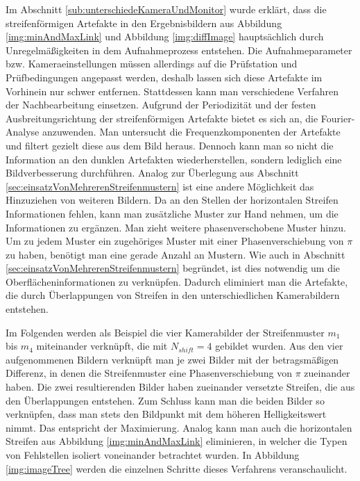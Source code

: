 Im Abschnitt \ref{sub:unterschiedeKameraUndMonitor} wurde erklärt, dass die streifenförmigen Artefakte in den Ergebnisbildern aus Abbildung \ref{img:minAndMaxLink} und Abbildung \ref{img:diffImage} hauptsächlich durch Unregelmäßigkeiten in dem Aufnahmeprozess entstehen.
Die Aufnahmeparameter bzw. Kameraeinstellungen müssen allerdings auf die Prüfstation und Prüfbedingungen angepasst werden, deshalb lassen sich diese Artefakte im Vorhinein nur schwer entfernen.
Stattdessen kann man verschiedene Verfahren der Nachbearbeitung einsetzen.
Aufgrund der Periodizität und der festen Ausbreitungsrichtung der streifenförmigen Artefakte bietet es sich an, die Fourier-Analyse anzuwenden.
Man untersucht die Frequenzkomponenten der Artefakte und filtert gezielt diese aus dem Bild heraus.
Dennoch kann man so nicht die Information an den dunklen Artefakten wiederherstellen, sondern lediglich eine Bildverbesserung durchführen.
Analog zur Überlegung aus Abschnitt \ref{sec:einsatzVonMehrerenStreifenmustern} ist eine andere Möglichkeit das Hinzuziehen von weiteren Bildern.
Da an den Stellen der horizontalen Streifen Informationen fehlen, kann man zusätzliche Muster zur Hand nehmen, um die Informationen zu ergänzen.
Man zieht weitere phasenverschobene Muster hinzu.
Um zu jedem Muster ein zugehöriges Muster mit einer Phasenverschiebung von $\pi$ zu haben, benötigt man eine gerade Anzahl an Mustern.
Wie auch in Abschnitt \ref{sec:einsatzVonMehrerenStreifenmustern} begründet, ist dies notwendig um die Oberflächeninformationen zu verknüpfen.
Dadurch eliminiert man die Artefakte, die durch Überlappungen von Streifen in den unterschiedlichen Kamerabildern entstehen.

\p
Im Folgenden werden als Beispiel die vier Kamerabilder der Streifenmuster $m_1$ bis $m_4$ miteinander verknüpft, die mit $N_{shift} = 4$ gebildet wurden.
Aus den vier aufgenommenen Bildern verknüpft man je zwei Bilder mit der betragsmäßigen Differenz, in denen die Streifenmuster eine Phasenverschiebung von $\pi$ zueinander haben.
Die zwei resultierenden Bilder haben zueinander versetzte Streifen, die aus den Überlappungen entstehen.
Zum Schluss kann man die beiden Bilder so verknüpfen, dass man stets den Bildpunkt mit dem höheren Helligkeitswert nimmt.
Das entspricht der Maximierung.
Analog kann man auch die horizontalen Streifen aus Abbildung \ref{img:minAndMaxLink} eliminieren, in welcher die Typen von Fehlstellen isoliert voneinander betrachtet wurden.
In Abbildung \ref{img:imageTree} werden die einzelnen Schritte dieses Verfahrens veranschaulicht.

